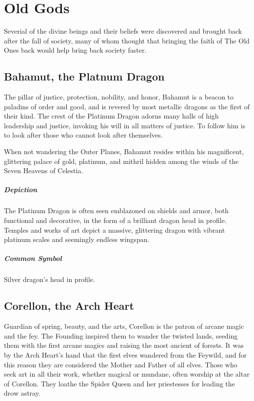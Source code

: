 \documentclass[letterpaper, twocolumn, openany, nodeprecatedcode, layout=true]{dndbook}
\begin{document}
\section{Old Gods}

Severial of the divine beings and their beliefs were discovered and brought back after the
fall of society, many of whom thought that bringing the faith of The Old Ones back would
help bring back society faster.

\subsection{Bahamut, the Platnum Dragon}

The pillar of justice, protection, nobility, and honor, Bahamut is a beacon to
paladins of order and good, and is revered by most metallic dragons as the first of
their kind. The crest of the Platinum Dragon adorns many halls of high leadership and
justice, invoking his will in all matters of justice. To follow him is to look after
those who cannot look after themselves.

When not wandering the Outer Planes, Bahamut resides within his magnificent, glittering
palace of gold, platinum, and mithril hidden among the winds of the Seven Heavens of Celestia.

\subparagraph{Depiction}
The Platinum Dragon is often seen emblazoned on shields and armor, both functional and
decorative, in the form of a brilliant dragon head in profile. Temples and works of art
depict a massive, glittering dragon with vibrant platinum scales and seemingly
endless wingspan.

\subparagraph{Common Symbol}
Silver dragon’s head in profile.

\subsection{Corellon, the Arch Heart}

Guardian of spring, beauty, and the arts, Corellon is the patron of arcane magic and
the fey. The Founding inspired them to wander the twisted lands, seeding them with the
first arcane magics and raising the most ancient of forests. It was by the Arch Heart’s
hand that the first elves wandered from the Feywild, and for this reason they are
considered the Mother and Father of all elves. Those who seek art in all their work,
whether magical or mundane, often worship at the altar of Corellon. They loathe the
Spider Queen and her priestesses for leading the drow astray.
\end{document}
